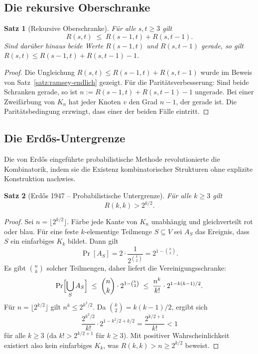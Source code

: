 \documentclass[12pt,a4paper]{amsart}
\newtheorem{theorem}{Satz}[section]
\theoremstyle{definition}
\theoremstyle{remark}
\begin{document}
\subsection{Die rekursive Oberschranke}

\begin{theorem}[Rekursive Oberschranke]\label{satz:rekursiv}
F\"ur alle $s,t \ge 3$ gilt
\[
  R(s,t) \;\le\; R(s-1,t) + R(s,t-1).
\]
Sind dar\"uber hinaus beide Werte $R(s-1,t)$ und $R(s,t-1)$ gerade, so gilt
$R(s,t) \le R(s-1,t) + R(s,t-1) - 1$.
\end{theorem}

\begin{proof}
Die Ungleichung $R(s,t) \le R(s-1,t) + R(s,t-1)$ wurde im Beweis von
Satz~\ref{satz:ramsey-endlich} gezeigt.  F\"ur die Parit\"atsverbesserung:
Sind beide Schranken gerade, so ist $n := R(s-1,t) + R(s,t-1) - 1$ ungerade.
Bei einer Zweif\"arbung von $K_n$ hat jeder Knoten $v$ den Grad $n-1$, der gerade
ist.  Die Parit\"atsbedingung erzwingt, dass einer der beiden F\"alle eintritt.
\end{proof}

\subsection{Die Erd\H{o}s-Untergrenze}

Die von Erd\H{o}s \cite{Erdos1947} eingeführte probabilistische Methode
revolutionierte die Kombinatorik, indem sie die Existenz kombinatorischer
Strukturen ohne explizite Konstruktion nachwies.

\begin{theorem}[Erd\H{o}s 1947 -- Probabilistische Untergrenze]\label{satz:erdos-unter}
F\"ur alle $k \ge 3$ gilt
\[
  R(k,k) > 2^{k/2}.
\]
\end{theorem}

\begin{proof}
Sei $n = \lfloor 2^{k/2} \rfloor$.  F\"arbe jede Kante von $K_n$ unabh\"angig
und gleichverteilt rot oder blau.  F\"ur eine feste $k$-elementige Teilmenge
$S \subseteq V$ sei $A_S$ das Ereignis, dass $S$ ein einfarbiges $K_k$ bildet.
Dann gilt
\[
  \Pr[A_S] = 2 \cdot \frac{1}{2^{\binom{k}{2}}} = 2^{1-\binom{k}{2}}.
\]
Es gibt $\binom{n}{k}$ solcher Teilmengen, daher liefert die Vereinigungsschranke:
\[
  \Pr\Bigl[\bigcup_S A_S\Bigr]
  \;\le\; \binom{n}{k} \cdot 2^{1-\binom{k}{2}}
  \;\le\; \frac{n^k}{k!} \cdot 2^{1-k(k-1)/2}.
\]
F\"ur $n = \lfloor 2^{k/2}\rfloor$ gilt $n^k \le 2^{k^2/2}$.  Da
$\binom{k}{2} = k(k-1)/2$, ergibt sich
\[
  \frac{2^{k^2/2}}{k!} \cdot 2^{1-k^2/2+k/2}
  = \frac{2^{k/2+1}}{k!} < 1
\]
f\"ur alle $k \ge 3$ (da $k! > 2^{k/2+1}$ f\"ur $k \ge 3$).  Mit positiver
Wahrscheinlichkeit existiert also kein einfarbiges $K_k$, was
$R(k,k) > n \ge 2^{k/2}$ beweist.
\end{proof}
\end{document}
